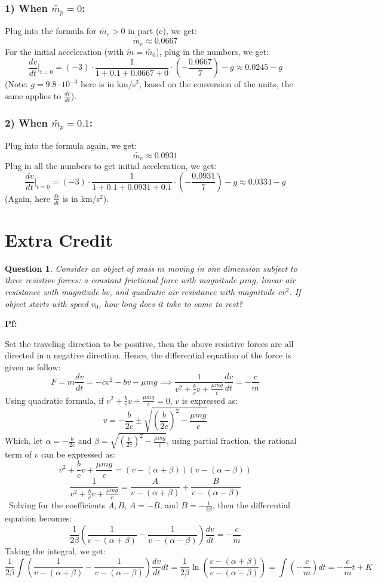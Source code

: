 \documentclass{article}
\newtheorem{question}{Question}
\begin{document}
\subsubsection*{1) When $\tilde{m_p}=0$:}
Plug into the formula for $\tilde{m_e}>0$ in part (c), we get:
$$\tilde{m_e} \approx 0.0667 $$
For the initial acceleration (with $\tilde{m} = \tilde{m_0}$), plug in the numbers, we get:
$$\frac{dv}{dt}\bigg|_{t=0} = (-3)\cdot\frac{1}{1+0.1+0.0667+0}\cdot\left(-\frac{0.0667}{7}\right)-g \approx 0.0245-g$$
(Note: $g=9.8\cdot 10^{-3}$ here is in km/s$^2$, based on the conversion of the units, the same applies to $\frac{dv}{dt}$).

\subsubsection*{2) When $\tilde{m_p}=0.1$:}
Plug into the formula again, we get:
$$\tilde{m_e} \approx 0.0931$$
Plug in all the numbers to get initial acceleration, we get:
$$\frac{dv}{dt}\bigg|_{t=0} = (-3)\cdot\frac{1}{1+0.1+0.0931+0.1}\cdot\left(-\frac{0.0931}{7}\right)-g \approx 0.0334-g$$
(Again, here $\frac{dv}{dt}$ is in km/s$^2$). 


\break

\section{Extra Credit}%
\begin{question}\label{q6}
    Consider an object of mass $m$ moving in one dimension subject to three resistive forces: a constant frictional force with magnitude $\mu mg$, linear air resistance with magnitude $bv$, and quadratic air resistance with magnitude $cv^2$. If object starts with speed $v_0$, how long does it take to come to rest?
\end{question}

\textbf{Pf:}

Set the traveling direction to be positive, then the above resistive forces are all directed in a negative direction. Hence, the differential equation of the force is given as follow:
$$F = m\frac{dv}{dt} = - cv^2- bv-\mu mg  \implies \frac{1}{v^2+\frac{b}{c}v+\frac{\mu mg}{c}}\frac{dv}{dt}=-\frac{c}{m}$$
Using quadratic formula, if $v^2+\frac{b}{c}v+\frac{\mu mg}{c}=0$, $v$ is expressed as:
$$v=-\frac{b}{2c}\pm\sqrt{\left(\frac{b}{2c}\right)^2-\frac{\mu mg}{c}}$$
Which, let $\alpha=-\frac{b}{2c}$ and $\beta = \sqrt{(\frac{b}{2c})^2-\frac{\mu mg}{c}}$, using partial fraction, the rational term of $v$ can be expressed as:
$$v^2+\frac{b}{c}v+\frac{\mu mg}{c} = (v-(\alpha+\beta))(v-(\alpha-\beta))$$
$$\frac{1}{v^2+\frac{b}{c}v+\frac{\mu mg}{c}}=\frac{A}{v-(\alpha+\beta)}+\frac{B}{v-(\alpha-\beta)}$$\
Solving for the coefficients $A,B$, $A=-B$, and $B=-\frac{1}{2\beta}$, then the differential equation becomes:
$$\frac{1}{2\beta}\left(\frac{1}{v-(\alpha+\beta)}-\frac{1}{v-(\alpha-\beta)}\right)\frac{dv}{dt}=-\frac{c}{m}$$
Taking the integral, we get:
$$\frac{1}{2\beta}\int\left(\frac{1}{v-(\alpha+\beta)}-\frac{1}{v-(\alpha-\beta)}\right)\frac{dv}{dt}dt = \frac{1}{2\beta}\ln\left(\frac{v-(\alpha+\beta)}{v-(\alpha-\beta)}\right)= \int\left(-\frac{c}{m}\right)dt = -\frac{c}{m}t+K$$
\end{document}
